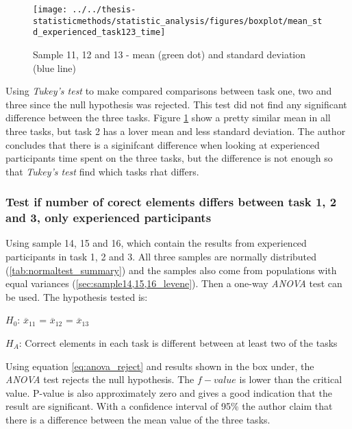 \begin{figure}[h!]
	\centering
	\texttt{[image: ../../thesis-statisticmethods/statistic\_analysis/figures/boxplot/mean\_std\_experienced\_task123\_time]}
	\caption{Sample 11, 12 and 13 - mean (green dot) and standard deviation (blue line)}
	\label{fig:meanstdexperiencedtask123time}
\end{figure}

Using \textit{Tukey's test} to make compared comparisons between task one, two and three since the null hypothesis was rejected. This test did not find any significant difference between the three tasks. Figure \ref{fig:meanstdexperiencedtask123time} show a pretty similar mean in all three tasks, but task 2 has a lover mean and less standard deviation. The author concludes that there is a siginifcant difference when looking at experienced participants time spent on the three tasks, but the difference is not enough so that \textit{Tukey's test} find which tasks rhat differs. 

\subsubsection[Sample 14, 15 and 16]{Test if number of corect elements differs between task 1, 2 and 3, only experienced participants}
Using sample 14, 15 and 16, which contain the results from experienced participants in task 1, 2 and 3. All three samples are normally distributed (\ref{tab:normaltest_summary}) and the samples also come from populations with equal variances (\ref{sec:sample14,15,16_levene}). Then a one-way \textit{ANOVA} test can be used. The hypothesis tested is: 

\centerline{$H_{0}$: $\overline{x}_11$ = $\overline{x}_12$ = $\overline{x}_13$}
\centerline{$H_{A}$: Correct elements in each task is different between at least two of the tasks}

Using equation \ref{eq:anova_reject} and results shown in the box under, the \textit{ANOVA} test rejects the null hypothesis. The $f-value$ is lower than the critical value. P-value is also approximately zero and gives a good indication that the result are significant. With a confidence interval of 95\% the author claim that there is a difference between the mean value of the three tasks.

